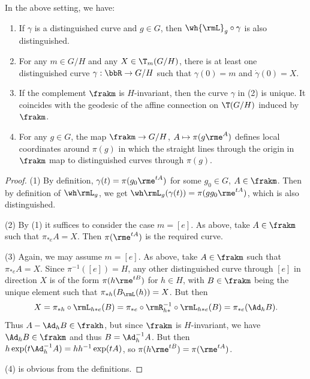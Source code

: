 \begin{prop}\label{prop 1.4.11 Cap}
    In the above setting, we have: 
    \begin{enumerate}[label=(\arabic*)]
        \item If $\gamma$ is a distinguished curve and $g\in G$, then $\wh{\rmL}_g\circ\gamma$ is also distinguished.
        \item For any $m\in G\slash H$ and any $X\in \T_m(G\slash H)$, there is at least one distinguished curve $\gamma:\bbR\to G\slash H$ such that $\gamma(0)=m$ and $\dot\gamma(0)=X$.
        \item If the complement $\frakm$ is $H$-invariant, then the curve $\gamma$ in (2) is unique. It coincides with the geodesic of the affine connection on $\T(G\slash H)$ induced by $\frakm$.
        \item For any $g\in G$, the map $\frakm\to G\slash H$, $A\mapsto \pi(g\rme^A)$ defines local coordinates around $\pi(g)$ in which the straight lines through the origin in $\frakm$ map to distinguished curves through $\pi(g)$.
    \end{enumerate}
\end{prop}
\begin{proof}
    (1) By definition, $\gamma(t)=\pi(g_0\rme^{tA})$ for some $g_0\in G$, $A\in\frakm$. Then by definition of $\wh \rmL_g$, we get $\wh \rmL_g(\gamma(t))=\pi(gg_0\rme^{tA})$, which is also distinguished.

    (2) By (1) it suffices to consider the case $m=[e]$. As above, take $A\in\frakm$ such that $\pi_{\ast e}A=X$. Then $\pi(\rme^{tA})$ is the required curve.

    (3) Again, we may assume $m=[e]$. As above, take $A\in\frakm$ such that $\pi_{\ast e}A=X$. Since $\pi^{-1}([e])=H$, any other distinguished curve through $[e]$ in direction $X$ is of the form $\pi(h\rme^{tB})$ for $h\in H$, with $B\in\frakm$ being the unique element such that $\pi_{\ast h}(B_\rmL(h))=X$. But then 
    \[X=\pi_{\ast h}\circ \rmL_{h\ast e}(B)=\pi_{\ast e}\circ \rmR_{h\ast}^{-1}\circ \rmL_{h\ast e}(B)=\pi_{\ast e}(\Ad_h B).\]
    Thus $A-\Ad_h B\in\frakh$, but since $\frakm$ is $H$-invariant, we have $\Ad_h B\in\frakm$ and thus $B=\Ad_h^{-1}A$. But then $h\exp(t\Ad_{h}^{-1}A)=hh^{-1}\exp(tA)$, so $\pi(h\rme^{tB})=\pi(\rme^{tA})$.

    (4) is obvious from the definitions.
\end{proof}

